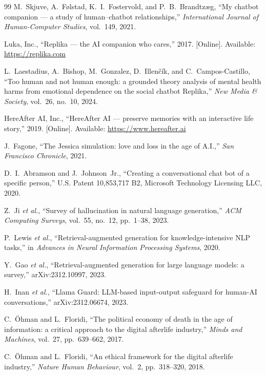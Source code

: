\documentclass[11pt,a4paper]{report}
\begin{document}
\begin{thebibliography}{99}
 M.~Skjuve, A.~F\o lstad, K.~I.~Fostervold, and P.~B.~Brandtz\ae g, ``My chatbot companion --- a study of human--chatbot relationships,'' \emph{International Journal of Human-Computer Studies}, vol.~149, 2021.

 Luka, Inc., ``Replika --- the AI companion who cares,'' 2017. [Online]. Available: \url{https://replika.com}

 L.~Laestadius, A.~Bishop, M.~Gonzalez, D.~Illen\v{c}\'ik, and C.~Campos-Castillo, ``Too human and not human enough: a grounded theory analysis of mental health harms from emotional dependence on the social chatbot Replika,'' \emph{New Media \& Society}, vol.~26, no.~10, 2024.

 HereAfter AI, Inc., ``HereAfter AI --- preserve memories with an interactive life story,'' 2019. [Online]. Available: \url{https://www.hereafter.ai}

 J.~Fagone, ``The Jessica simulation: love and loss in the age of A.I.,'' \emph{San Francisco Chronicle}, 2021.

 D.~I.~Abramson and J.~Johnson~Jr., ``Creating a conversational chat bot of a specific person,'' U.S. Patent 10,853,717 B2, Microsoft Technology Licensing LLC, 2020.

 Z.~Ji \emph{et al.}, ``Survey of hallucination in natural language generation,'' \emph{ACM Computing Surveys}, vol.~55, no.~12, pp.~1--38, 2023.

 P.~Lewis \emph{et al.}, ``Retrieval-augmented generation for knowledge-intensive NLP tasks,'' in \emph{Advances in Neural Information Processing Systems}, 2020.

 Y.~Gao \emph{et al.}, ``Retrieval-augmented generation for large language models: a survey,'' arXiv:2312.10997, 2023.

 H.~Inan \emph{et al.}, ``Llama Guard: LLM-based input-output safeguard for human-AI conversations,'' arXiv:2312.06674, 2023.

 C.~\"Ohman and L.~Floridi, ``The political economy of death in the age of information: a critical approach to the digital afterlife industry,'' \emph{Minds and Machines}, vol.~27, pp.~639--662, 2017.

 C.~\"Ohman and L.~Floridi, ``An ethical framework for the digital afterlife industry,'' \emph{Nature Human Behaviour}, vol.~2, pp.~318--320, 2018.


\end{thebibliography}
\end{document}

